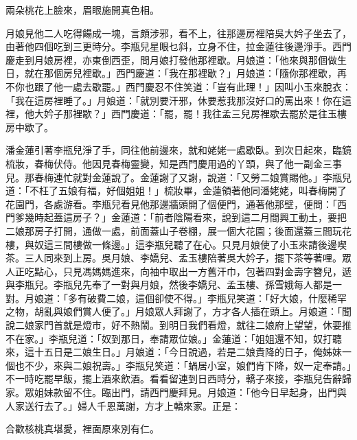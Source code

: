 兩朵桃花上臉來，眉眼施開真色相。

月娘見他二人吃得餳成一塊，言頗涉邪，看不上，往那邊房裡陪吳大妗子坐去了，由著他四個吃到三更時分。李瓶兒星眼乜斜，立身不住，拉金蓮往後邊淨手。西門慶走到月娘房裡，亦東倒西歪，問月娘打發他那裡歇。月娘道：「他來與那個做生日，就在那個房兒裡歇。」西門慶道：「我在那裡歇？」月娘道：「隨你那裡歇，再不你也跟了他一處去歇罷。」西門慶忍不住笑道：「豈有此理！」因叫小玉來脫衣：「我在這房裡睡了。」月娘道：「就別要汗邪，休要惹我那沒好口的罵出來！你在這裡，他大妗子那裡歇？」西門慶道：「罷，罷！我往孟三兒房裡歇去罷於是往玉樓房中歇了。

潘金蓮引著李瓶兒淨了手，同往他前邊來，就和姥姥一處歇臥。到次日起來，臨鏡梳妝，春梅伏侍。他因見春梅靈變，知是西門慶用過的丫頭，與了他一副金三事兒。那春梅連忙就對金蓮說了。金蓮謝了又謝，說道：「又勞二娘賞賜他。」李瓶兒道：「不枉了五娘有福，好個姐姐！」梳妝畢，金蓮領著他同潘姥姥，叫春梅開了花園門，各處游看。李瓶兒看見他那邊牆頭開了個便門，通著他那壁，便問：「西門爹幾時起蓋這房子？」金蓮道：「前者陰陽看來，說到這二月間興工動土，要把二娘那房子打開，通做一處，前面蓋山子卷棚，展一個大花園；後面還蓋三間玩花樓，與奴這三間樓做一條邊。」這李瓶兒聽了在心。只見月娘使了小玉來請後邊喫茶。三人同來到上房。吳月娘、李嬌兒、孟玉樓陪著吳大妗子，擺下茶等著哩。眾人正吃點心，只見馮媽媽進來，向袖中取出一方舊汗巾，包著四對金壽字簪兒，遞與李瓶兒。李瓶兒先奉了一對與月娘，然後李嬌兒、孟玉樓、孫雪娥每人都是一對。月娘道：「多有破費二娘，這個卻使不得。」李瓶兒笑道：「好大娘，什麼稀罕之物，胡亂與娘們賞人便了。」月娘眾人拜謝了，方才各人插在頭上。月娘道：「聞說二娘家門首就是燈市，好不熱鬧。到明日我們看燈，就往二娘府上望望，休要推不在家。」李瓶兒道：「奴到那日，奉請眾位娘。」金蓮道：「姐姐還不知，奴打聽來，這十五日是二娘生日。」月娘道：「今日說過，若是二娘貴降的日子，俺姊妹一個也不少，來與二娘祝壽。」李瓶兒笑道：「蝸居小室，娘們肯下降，奴一定奉請。」不一時吃罷早飯，擺上酒來飲酒。看看留連到日西時分，轎子來接，李瓶兒告辭歸家。眾姐妹款留不住。臨出門，請西門慶拜見。月娘道：「他今日早起身，出門與人家送行去了。」婦人千恩萬謝，方才上轎來家。正是：

合歡核桃真堪愛，裡面原來別有仁。


